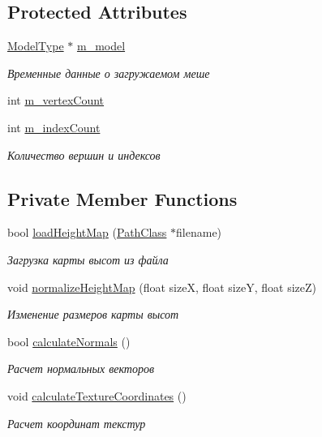 \subsection*{Protected Attributes}
\begin{DoxyCompactItemize}
\item 
\hyperlink{struct_mesh_loader_class_1_1_model_type}{Model\+Type} $\ast$ \hyperlink{class_mesh_loader_class_a5b4adc40305c32c8afbe737cfebf6de4}{m\+\_\+model}
\begin{DoxyCompactList}\small\item\em Временные данные о загружаемом меше \end{DoxyCompactList}\item 
int \hyperlink{class_mesh_loader_class_a6a6f55e4d4e2321460d941d68e8a6a1c}{m\+\_\+vertex\+Count}
\item 
int \hyperlink{class_mesh_loader_class_a295180d6e2a2d0df952c53da7098ec20}{m\+\_\+index\+Count}
\begin{DoxyCompactList}\small\item\em Количество вершин и индексов \end{DoxyCompactList}\end{DoxyCompactItemize}
\subsection*{Private Member Functions}
\begin{DoxyCompactItemize}
\item 
bool \hyperlink{class_height_map_loader_class_aa4650d025c9b14a3d7b898eb10ceb500}{load\+Height\+Map} (\hyperlink{class_path_class}{Path\+Class} $\ast$filename)
\begin{DoxyCompactList}\small\item\em Загрузка карты высот из файла \end{DoxyCompactList}\item 
void \hyperlink{class_height_map_loader_class_a8c16c7f42e9bef2754ae98236f3728c3}{normalize\+Height\+Map} (float sizeX, float sizeY, float sizeZ)
\begin{DoxyCompactList}\small\item\em Изменение размеров карты высот \end{DoxyCompactList}\item 
bool \hyperlink{class_height_map_loader_class_a8474fae8a6fb8e4d2b1cddbcf24c0311}{calculate\+Normals} ()
\begin{DoxyCompactList}\small\item\em Расчет нормальных векторов \end{DoxyCompactList}\item 
void \hyperlink{class_height_map_loader_class_ae5f92c8fde8e3d2e677cfa3c6309d68e}{calculate\+Texture\+Coordinates} ()
\begin{DoxyCompactList}\small\item\em Расчет координат текстур \end{DoxyCompactList}\end{DoxyCompactItemize}
